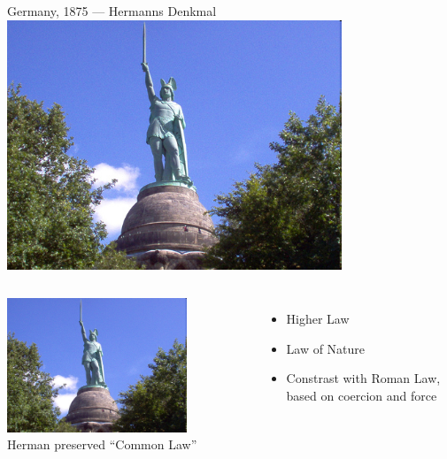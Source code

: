 \documentclass{beamer}
\begin{document}
\begin{frame}{Germany, 1875 --- Hermanns Denkmal}
    \centering
    \includegraphics[width=0.75\textwidth]{img/herman2.png} \\
\end{frame}

\begin{frame}
    \begin{columns}[onlytextwidth]
            \centering
            \includegraphics[width=0.75\textwidth]{img/herman2.png} \\

            Herman preserved ``Common Law''
            \pause
            \begin{itemize}
                \item Higher Law
                \pause
                \item Law of Nature
                \pause
                \item Constrast with Roman Law, based on coercion and force
            \end{itemize}
    \end{columns}
\end{frame}
\end{document}
